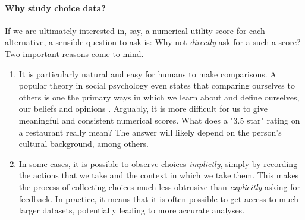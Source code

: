\paragraph{Why study choice data?}
If we are ultimately interested in, say, a numerical utility score for each alternative, a sensible question to ask is:
Why not \emph{directly} ask for a such a score?
Two important reasons come to mind.
\begin{enumerate}
\item It is particularly natural and easy for humans to make comparisons.
A popular theory in social psychology even states that comparing ourselves to others is one the primary ways in which we learn about and define ourselves, our beliefs and opinions \citep{festinger1954theory}.
Arguably, it is more difficult for us to give meaningful and consistent numerical scores.
What does a "3.5 star" rating on a restaurant really mean? The answer will likely depend on the person's cultural background, among others.

\item In some cases, it is possible to observe choices \emph{implictly}, simply by recording the actions that we take and the context in which we take them.
This makes the process of collecting choices much less obtrusive than \emph{explicitly} asking for feedback.
In practice, it means that it is often possible to get access to much larger datasets, potentially leading to more accurate analyses.
\end{enumerate}


